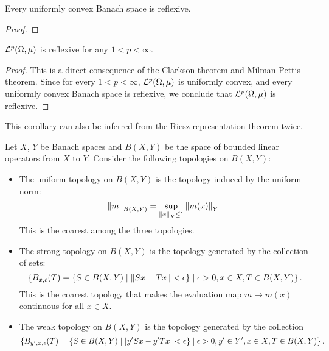 \begin{theorem}
    Every uniformly convex Banach space is reflexive.
\end{theorem}
\begin{proof}
    
\end{proof}

\begin{corollary}
    $\mathcal{L}^p(\Omega,\mu)$ is reflexive for any $1< p <\infty$.
\end{corollary}
\begin{proof}
    This is a direct consequence of the Clarkson theorem and 
    Milman-Pettis theorem. Since for every $1<p<\infty$, 
    $\mathcal{L}^p(\Omega,\mu)$ is uniformly convex, and every uniformly 
    convex Banach space is reflexive, we conclude that 
    $\mathcal{L}^p(\Omega,\mu)$ is reflexive.
\end{proof}
\begin{remark}
    This corollary can also be inferred from the Riesz 
    representation theorem twice. 
\end{remark}

\begin{remark}
    Let $X$, $Y$ be Banach spaces and $B(X, Y)$ be the space of bounded linear 
    operators from $X$ to $Y$. Consider the following topologies on $B(X,Y)$:
    \begin{itemize}
        \item The uniform topology on $B(X,Y)$ is the topology induced by the 
        uniform norm: 
        \begin{equation*}
            \left\lVert {m} \right\rVert_{B(X,Y)} = \sup_{\left\lVert {x} \right\rVert_X\leq 1} \left\lVert {m(x)} \right\rVert_Y.
        \end{equation*}
        This is the coarest among the three topologies.
        \item The strong topology on $B(X,Y)$ is the topology generated by the 
        collection of sets: 
        \begin{equation*}
            \left\{ B_{x,\epsilon}(T) = \left\{ S\in B(X,Y) \;\middle\vert\; \left\lVert {Sx - Tx} \right\rVert<\epsilon \right\} \;\middle\vert\; \epsilon>0, x\in X, T\in B(X,Y) \right\}.
        \end{equation*}
        This is the coarest topology that makes the evaluation map $m\mapsto m(x)$ 
        continuous for all $x\in X$.
        \item The weak topology on $B(X,Y)$ is the topology generated by the collection 
        \begin{equation*}
            \left\{ B_{y',x,\epsilon}(T) = \left\{ S\in B(X,Y) \;\middle\vert\; \left\lvert {y'Sx - y'Tx} \right\rvert<\epsilon \right\} \;\middle\vert\; \epsilon>0, y'\in Y', x\in X, T\in B(X,Y) \right\}.
        \end{equation*}
    \end{itemize}
\end{remark}